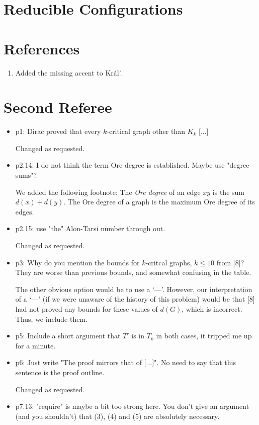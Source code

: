 \documentclass{article}
\begin{document}
\section{Reducible Configurations}
\section{References}
\begin{enumerate}
\item Added the missing accent to Kr\'{a}l'.
\end{enumerate}

\section*{Second Referee}
\begin{itemize}
\item p1: Dirac proved that every $k$-critical graph other than $K_k$ [...]

Changed as requested.
\item p2.14:  I do not think the term Ore degree is established. Maybe use "degree sums"?

We added the following footnote: The \emph{Ore degree} of an edge $xy$ is the sum
$d(x)+d(y)$.  The Ore degree of a graph is the maximum Ore degree of its edges.
\item p2.15: use "the" Alon-Tarsi number through out.

Changed as requested.

\item p3: Why do you mention the bounds for $k$-critcal graphs, $k\le10$ from [8]?
They are worse than previous bounds, and somewhat confusing in the table.

The other obvious option would be to use a `---'.  However, our interpretation
of a `---' (if we were unaware of the history of this problem) would be that [8]
had not proved any bounds for these values of $d(G)$, which is incorrect.  Thus,
we include them.

\item p5: Include a short argument that $T'$ is in $T_k$ in both cases, it tripped me up for a minute.
\item p6: Just write "The proof mirrors that of [...]". No need to say that this sentence is the proof outline.

Changed as requested.
\item p7.13: "require" is maybe a bit too strong here. You don't give an argument (and you shouldn't) that (3), (4) and (5) are absolutely necessary.


\end{itemize}
\end{document}
